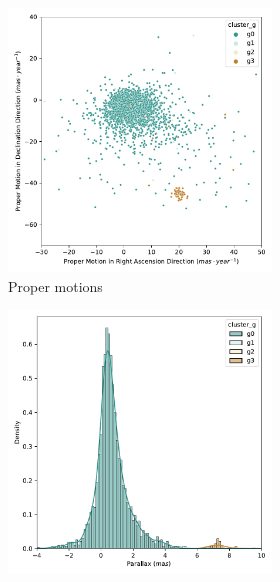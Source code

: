 \documentclass[11pt, a4paper, english]{book}
\begin{document}
\begin{figure}[htbp]
  \centering
  \begin{subfigure}{0.9\textwidth}
    \centering
    \begin{subfigure}[t]{0.3\textwidth}
      \centering
      \includegraphics[width=\textwidth]{../figures/dec_pm_melotte_22.pdf}
      \caption{Proper motions}
    \end{subfigure}
    \hfill
    \begin{subfigure}[t]{0.3\textwidth}
      \centering
      \includegraphics[width=\textwidth]{../figures/dec_parallax_melotte_22.pdf}

\end{subfigure}
\end{subfigure}
\end{figure}
\end{document}
